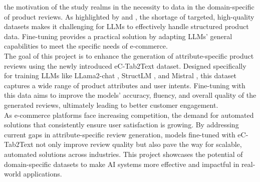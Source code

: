 the motivation of the study realms in the necessity to data in the domain-specific of product reviews. As highlighted by \citep{macková2023promap} and \citep{Wang2023Emotional}, the shortage of targeted, high-quality datasets makes it challenging for LLMs to effectively handle structured product data. Fine-tuning provides a practical solution by adapting LLMs' general capabilities to meet the specific needs of e-commerce.
\\

The goal of this project is to enhance the generation of attribute-specific product reviews using the newly introduced eC-Tab2Text dataset. Designed specifically for training LLMs like LLama2-chat \citep{touvron2023llama}, StructLM \citep{zhuang2024structlm}, and Mistral \citep{jiang2023mistral}, this dataset captures a wide range of product attributes and user intents. Fine-tuning with this data aims to improve the models' accuracy, fluency, and overall quality of the generated reviews, ultimately leading to better customer engagement.
\\

As e-commerce platforms face increasing competition, the demand for automated solutions that consistently ensure user satisfaction is growing. By addressing current gaps in attribute-specific review generation, models fine-tuned with eC-Tab2Text not only improve review quality but also pave the way for scalable, automated solutions across industries. This project showcases the potential of domain-specific datasets to make AI systems more effective and impactful in real-world applications.